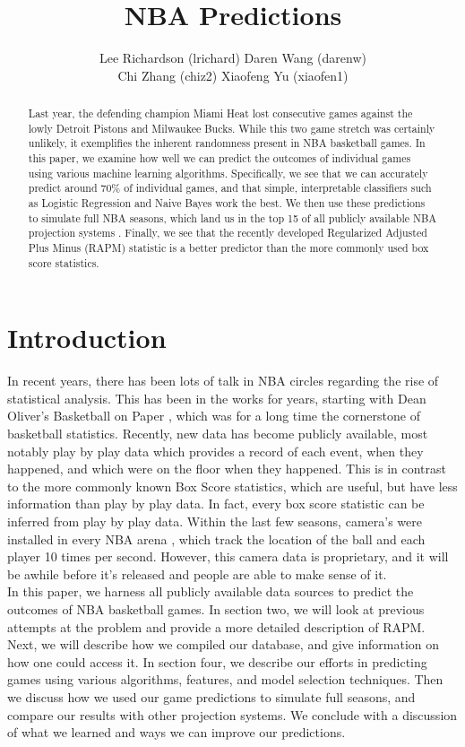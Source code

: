 \documentclass{article} %
\title{NBA Predictions}
\author{Lee Richardson (lrichard) Daren Wang (darenw) \\ Chi Zhang (chiz2) Xiaofeng Yu (xiaofen1)}
\begin{document}
\maketitle

\begin{abstract}
Last year, the defending champion Miami Heat lost consecutive games against the lowly Detroit Pistons and Milwaukee Bucks. While this two game stretch was certainly unlikely, it exemplifies the inherent randomness present in NBA basketball games. In this paper, we examine how well we can predict the outcomes of individual games using various machine learning algorithms. Specifically, we see that we can accurately predict around 70\% of individual games, and that simple, interpretable classifiers such as Logistic Regression and Naive Bayes work the best. We then use these predictions to simulate full NBA seasons, which land us in the top 15 of all publicly available NBA projection systems \cite{projections}. Finally, we see that the recently developed Regularized Adjusted Plus Minus (RAPM) statistic is a better predictor than the more commonly used box score statistics. 
\end{abstract}

\section{Introduction}
	In recent years, there has been lots of talk in NBA circles regarding the rise of statistical analysis\cite{revolution}. This has been in the works for years, starting with Dean Oliver's Basketball on Paper \cite{bop}, which was for a long time the cornerstone of basketball statistics. Recently, new data has become publicly available, most notably play by play data which provides a record of each event, when they happened, and which were on the floor when they happened. This is in contrast to the more commonly known Box Score statistics, which are useful, but have less information than play by play data. In fact, every box score statistic can be inferred from play by play data. Within the last few seasons, camera's were installed in every NBA arena \cite{sportsvu}, which track the location of the ball and each player 10 times per second. However, this camera data is proprietary, and it will be awhile before it's released and people are able to make sense of it. \\

	In this paper, we harness all publicly available data sources to predict the outcomes of NBA basketball games. In section two, we will look at previous attempts at the problem and provide a more detailed description of RAPM. Next, we will describe how we compiled our database, and give information on how one could access it. In section four, we describe our efforts in predicting games using various algorithms, features, and model selection techniques. Then we discuss how we used our game predictions to simulate full seasons, and compare our results with other projection systems. We conclude with a discussion of what we learned and ways we can improve our predictions. 
\end{document}
